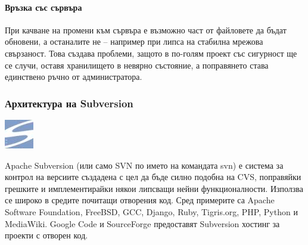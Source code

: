 \documentclass[a4paper]{article}
\begin{document}
      \paragraph{Връзка със сървъра}

      При качване на промени към сървъра е възможно част от файловете да бъдат
      обновени, а останалите не -- например при липса на стабилна мрежова
      свързаност. Това създава проблеми, защото в по-голям проект със сигурност
      ще се случи, оставя хранилището в невярно състояние, а поправянето
      става единствено ръчно от администратора.

    \subsubsection{Архитектура на Subversion}
    \includegraphics[scale=1.0]{svn_icon}
    
    Apache Subversion (или само SVN по името на командата svn) е система за
    контрол на версиите създадена с цел да бъде силно подобна на CVS,
    поправяйки грешките и имплементирайки някои липсващи нейни функционалности.
    Използва се широко в средите почитащи отворения код. Сред примерите са
    Apache Software Foundation, FreeBSD, GCC, Django, Ruby, Tigris.org, PHP,
    Python и MediaWiki. Google Code и SourceForge предоставят Subversion
    хостинг за проекти с отворен код.
\end{document}
